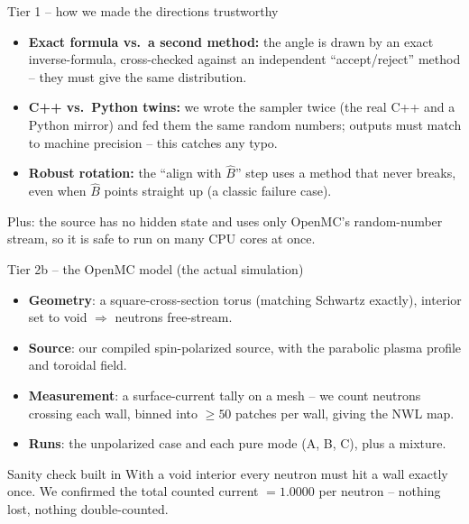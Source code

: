 \documentclass[aspectratio=169]{beamer}
\newcommand{\Bhat}{\hat{B}}
\newcommand{\keyword}[1]{\textcolor{blue!60!black}{\textbf{#1}}}
\begin{document}
\begin{frame}{Tier 1 -- how we made the directions trustworthy}
  \begin{itemize}
    \item \keyword{Exact formula vs.\ a second method:} the angle is drawn by an exact inverse-formula, cross-checked against an independent ``accept/reject'' method -- they must give the same distribution.
    \item \keyword{C++ vs.\ Python twins:} we wrote the sampler twice (the real C++ and a Python mirror) and fed them the \alert{same random numbers}; outputs must match to machine precision -- this catches any typo.
    \item \keyword{Robust rotation:} the ``align with $\Bhat$'' step uses a method that never breaks, even when $\Bhat$ points straight up (a classic failure case).
  \end{itemize}
  \vfill
  \footnotesize Plus: the source has \alert{no hidden state} and uses only OpenMC's random-number stream, so it is safe to run on many CPU cores at once.
\end{frame}

\begin{frame}{Tier 2b -- the OpenMC model (the actual simulation)}
  \begin{itemize}
    \item \keyword{Geometry}: a square-cross-section torus (matching Schwartz exactly), interior set to \alert{void} $\Rightarrow$ neutrons free-stream.
    \item \keyword{Source}: our compiled spin-polarized source, with the parabolic plasma profile and toroidal field.
    \item \keyword{Measurement}: a \alert{surface-current tally on a mesh} -- we count neutrons crossing each wall, binned into $\ge 50$ patches per wall, giving the NWL map.
    \item \keyword{Runs}: the unpolarized case and each pure mode (A, B, C), plus a mixture.
  \end{itemize}
  \vfill
  \begin{block}{Sanity check built in}
    With a void interior every neutron must hit a wall exactly once. We confirmed the total counted current $=1.0000$ per neutron -- nothing lost, nothing double-counted.
  \end{block}
\end{frame}
\end{document}
